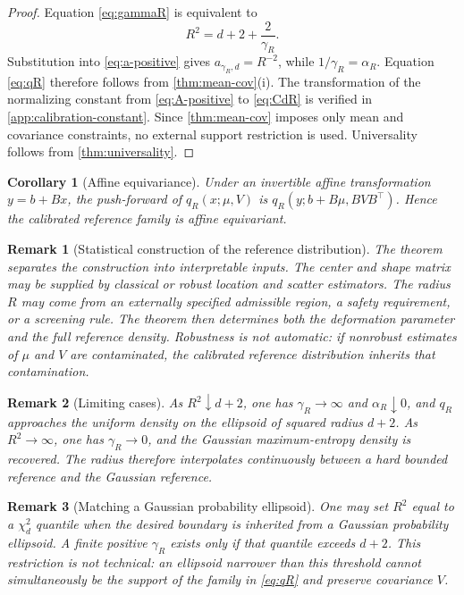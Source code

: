 \documentclass[pdflatex,sn-mathphys-num]{sn-jnl}
\theoremstyle{thmstyleone}
\newtheorem{corollary}{Corollary}
\theoremstyle{thmstyletwo}
\newtheorem{remark}{Remark}
\theoremstyle{thmstylethree}
\begin{document}
\begin{proof}
Equation \cref{eq:gammaR} is equivalent to
\[
 R^2=d+2+\frac{2}{\gamma_R}.
\]
Substitution into \cref{eq:a-positive} gives $a_{\gamma_R,d}=R^{-2}$, while $1/\gamma_R=\alpha_R$. Equation \cref{eq:qR} therefore follows from \cref{thm:mean-cov}(i). The transformation of the normalizing constant from \cref{eq:A-positive} to \cref{eq:CdR} is verified in \cref{app:calibration-constant}. Since \cref{thm:mean-cov} imposes only mean and covariance constraints, no external support restriction is used. Universality follows from \cref{thm:universality}.
\end{proof}

\begin{corollary}[Affine equivariance]\label{cor:affine-equivariance}
Under an invertible affine transformation $y=b+Bx$, the push-forward of $q_R(x;\mu,V)$ is $q_R(y;b+B\mu,BVB^\top)$. Hence the calibrated reference family is affine equivariant.
\end{corollary}

\begin{remark}[Statistical construction of the reference distribution]\label{rem:robust-inputs}
The theorem separates the construction into interpretable inputs. The center and shape matrix may be supplied by classical or robust location and scatter estimators. The radius $R$ may come from an externally specified admissible region, a safety requirement, or a screening rule. The theorem then determines both the deformation parameter and the full reference density. Robustness is not automatic: if nonrobust estimates of $\mu$ and $V$ are contaminated, the calibrated reference distribution inherits that contamination.
\end{remark}

\begin{remark}[Limiting cases]\label{rem:limits}
As $R^2\downarrow d+2$, one has $\gamma_R\to\infty$ and $\alpha_R\downarrow0$, and $q_R$ approaches the uniform density on the ellipsoid of squared radius $d+2$. As $R^2\to\infty$, one has $\gamma_R\to0$, and the Gaussian maximum-entropy density is recovered. The radius therefore interpolates continuously between a hard bounded reference and the Gaussian reference.
\end{remark}

\begin{remark}[Matching a Gaussian probability ellipsoid]\label{rem:chi-square}
One may set $R^2$ equal to a $\chi_d^2$ quantile when the desired boundary is inherited from a Gaussian probability ellipsoid. A finite positive $\gamma_R$ exists only if that quantile exceeds $d+2$. This restriction is not technical: an ellipsoid narrower than this threshold cannot simultaneously be the support of the family in \cref{eq:qR} and preserve covariance $V$.
\end{remark}
\end{document}
